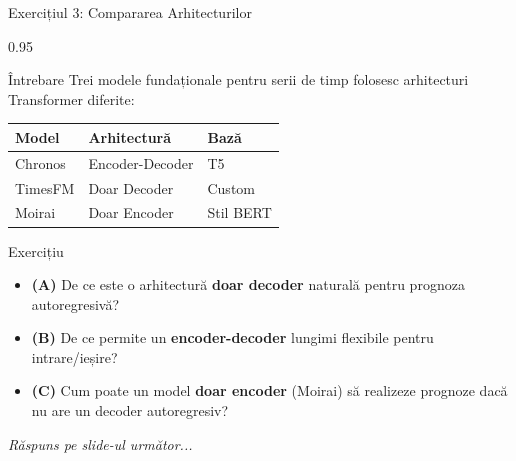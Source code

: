 \documentclass[9pt, aspectratio=169, t]{beamer}
\begin{document}
\begin{frame}{Exercițiul 3: Compararea Arhitecturilor}
    \begin{cminipage}{0.95\textwidth}
    {\footnotesize
    \begin{alertblock}{Întrebare}
        Trei modele fundaționale pentru serii de timp folosesc arhitecturi Transformer diferite:
        \begin{center}
        {\footnotesize
        \begin{tabular}{lll}
            \toprule
            \textbf{Model} & \textbf{Arhitectură} & \textbf{Bază} \\
            \midrule
            Chronos & Encoder-Decoder & T5 \\
            TimesFM & Doar Decoder & Custom \\
            Moirai  & Doar Encoder  & Stil BERT \\
            \bottomrule
        \end{tabular}
        }
        \end{center}
    \end{alertblock}

    \vspace{0.1cm}

    \begin{block}{Exercițiu}
        \begin{itemize}\setlength{\itemsep}{3pt}
            \item \textcolor{MainBlue}{\textbf{(A)}} De ce este o arhitectură \textbf{doar decoder} naturală pentru prognoza autoregresivă?
            \item \textcolor{MainBlue}{\textbf{(B)}} De ce permite un \textbf{encoder-decoder} lungimi flexibile pentru intrare/ieșire?
            \item \textcolor{MainBlue}{\textbf{(C)}} Cum poate un model \textbf{doar encoder} (Moirai) să realizeze prognoze dacă nu are un decoder autoregresiv?
        \end{itemize}
    \end{block}

    \vspace{0.1cm}

    \begin{center}
        \textit{Răspuns pe slide-ul următor...}
    \end{center}
    }
    \end{cminipage}
\end{frame}
\end{document}
